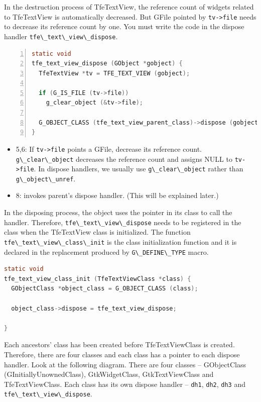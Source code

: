 In the destruction process of TfeTextView, the reference count of
widgets related to TfeTextView is automatically decreased. But GFile
pointed by \passthrough{\lstinline!tv->file!} needs to decrease its
reference count by one. You must write the code in the dispose handler
\passthrough{\lstinline!tfe\_text\_view\_dispose!}.

\begin{lstlisting}[language=C, numbers=left]
static void
tfe_text_view_dispose (GObject *gobject) {
  TfeTextView *tv = TFE_TEXT_VIEW (gobject);

  if (G_IS_FILE (tv->file))
    g_clear_object (&tv->file);

  G_OBJECT_CLASS (tfe_text_view_parent_class)->dispose (gobject);
}
\end{lstlisting}

\begin{itemize}
\tightlist
\item
  5,6: If \passthrough{\lstinline!tv->file!} points a GFile, decrease
  its reference count. \passthrough{\lstinline!g\_clear\_object!}
  decreases the reference count and assigns NULL to
  \passthrough{\lstinline!tv->file!}. In dispose handlers, we usually
  use \passthrough{\lstinline!g\_clear\_object!} rather than
  \passthrough{\lstinline!g\_object\_unref!}.
\item
  8: invokes parent's dispose handler. (This will be explained later.)
\end{itemize}

In the disposing process, the object uses the pointer in its class to
call the handler. Therefore,
\passthrough{\lstinline!tfe\_text\_view\_dispose!} needs to be
registered in the class when the TfeTextView class is initialized. The
function \passthrough{\lstinline!tfe\_text\_view\_class\_init!} is the
class initialization function and it is declared in the replacement
produced by \passthrough{\lstinline!G\_DEFINE\_TYPE!} macro.

\begin{lstlisting}[language=C]
static void
tfe_text_view_class_init (TfeTextViewClass *class) {
  GObjectClass *object_class = G_OBJECT_CLASS (class);

  object_class->dispose = tfe_text_view_dispose;

}
\end{lstlisting}

Each ancestors' class has been created before TfeTextViewClass is
created. Therefore, there are four classes and each class has a pointer
to each dispose handler. Look at the following diagram. There are four
classes -- GObjectClass (GInitiallyUnownedClass), GtkWidgetClass,
GtkTextViewClass and TfeTextViewClass. Each class has its own dispose
handler -- \passthrough{\lstinline!dh1!}, \passthrough{\lstinline!dh2!},
\passthrough{\lstinline!dh3!} and
\passthrough{\lstinline!tfe\_text\_view\_dispose!}.

